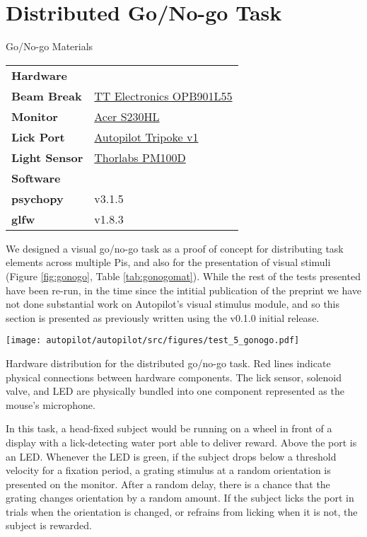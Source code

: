 \section{Distributed Go/No-go Task}
\label{sec:gonogo}

\begin{margintable}[0.4cm]
\caption{Go/No-go Materials}
\label{tab:gonogomat}
\noindent\begin{tabularx}{\linewidth}{lX}%
\toprule
\textbf{Hardware} & \\
\textbf{Beam Break} & \href{https://wiki.auto-pi-lot.com/index.php/TT_Electronics_OPB901L55}{TT Electronics OPB901L55} \\
\textbf{Monitor} & \href{https://www.productchart.com/monitors/16901}{Acer S230HL} \\
\textbf{Lick Port} & \href{https://wiki.auto-pi-lot.com/index.php/Autopilot_Tripoke}{Autopilot Tripoke v1} \\
\textbf{Light Sensor} & \href{https://www.thorlabs.com/newgrouppage9.cfm?objectgroup_id=3341}{Thorlabs PM100D} \\
\midrule
\textbf{Software} & \\
\textbf{psychopy} & v3.1.5 \\
\textbf{glfw} & v1.8.3 \\
\bottomrule
\end{tabularx}
\end{margintable}{}

We designed a visual go/no-go task as a proof of concept for distributing task elements across multiple Pis, and also for the presentation of visual stimuli (Figure \ref{fig:gonogo}, Table \ref{tab:gonogomat}). While the rest of the tests presented have been re-run, in the time since the intitial publication of the preprint we have not done substantial work on Autopilot's visual stimulus module, and so this section is presented as previously written using the v0.1.0 initial release.

\begin{marginfigure}[-0cm]
\texttt{[image: autopilot/autopilot/src/figures/test\_5\_gonogo.pdf]}
\caption{Hardware distribution for the distributed go/no-go task. Red lines indicate physical connections between hardware components. The lick sensor, solenoid valve, and LED are physically bundled into one component represented as the mouse's microphone.}
\label{fig:gonogo}
\end{marginfigure}

In this task, a head-fixed subject would be running on a wheel in front of a display with a lick-detecting water port able to deliver reward. Above the port is an LED. Whenever the LED is green, if the subject drops below a threshold velocity for a fixation period, a grating stimulus at a random orientation is presented on the monitor. After a random delay, there is a chance that the grating changes orientation by a random amount. If the subject licks the port in trials when the orientation is changed, or refrains from licking when it is not, the subject is rewarded. 

